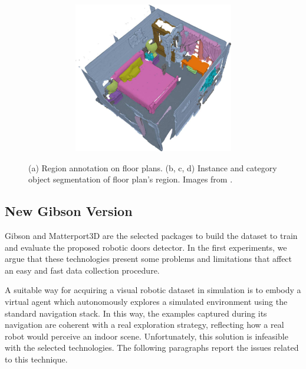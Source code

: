 \begin{figure}[h!]
\begin{subfigure}[b]{\linewidth}
\begin{subfigure}[b]{0.32\linewidth}
			\caption{}
			\label{fig:matterport_object_annotation_2}
		\end{subfigure}
		\hfil
		\begin{subfigure}[b]{0.32\linewidth}
			\centering
			\includegraphics[width=\textwidth]{images/matterport_room22_categories.pdf}
			\caption{}
			\label{fig:matterport_object_annotation_3}
		\end{subfigure}
	\end{subfigure}
	\caption{(a) Region annotation on floor plans. (b, c, d) Instance and category object segmentation of floor plan's region. Images from \cite{matterport}.}
\end{figure}

\subsection{New Gibson Version}
\label{sec:new_gibson_version}

Gibson and Matterport3D are the selected packages to build the dataset to train and evaluate the proposed robotic doors detector. In the first experiments, we argue that these technologies present some problems and limitations that affect an easy and fast data collection procedure. 

A suitable way for acquiring a visual robotic dataset in simulation is to embody a virtual agent which autonomously explores a simulated environment using the standard navigation stack. In this way, the examples captured during its navigation are coherent with a real exploration strategy, reflecting how a real robot would perceive an indoor scene. Unfortunately, this solution is infeasible with the selected technologies. The following paragraphs report the issues related to this technique. 

